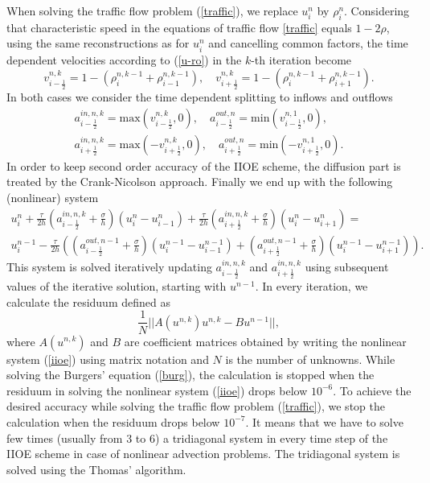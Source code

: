\documentclass[a4paper,12pt,twoside]{report}%
\newcounter{eqn}
\begin{document}
When solving the traffic flow problem (\ref{traffic}), we replace $ u^n_i $ by $ \rho^n_i $. Considering that characteristic speed in the equations of traffic flow \eqref{traffic} equals $ 1-2\rho $, using the same reconstructions as for $ u^n_i $ and cancelling common factors, the time dependent velocities according to (\ref{u-ro}) in the $ k $-th iteration become
\[ v^{n,k}_{i-\frac{1}{2}} = 1 - (\rho^{n,k-1}_i + \rho^{n,k-1}_{i-1}),\quad
v^{n,k}_{i+\frac{1}{2}} = 1 - (\rho^{n,k-1}_i + \rho^{n,k-1}_{i+1}). \]
In both cases we consider the time dependent splitting to inflows and outflows
\begin{eqnarray}
	a^{in,n,k}_{i-\frac{1}{2}} = \textrm{max}(v^{n,k}_{i-\frac{1}{2}},0),\quad 
	a^{out,n}_{i-\frac{1}{2}} = \textrm{min}(v^{n,1}_{i-\frac{1}{2}},0), \nonumber
	\\
	a^{in,n,k}_{i+\frac{1}{2}} = \textrm{max}(-v^{n,k}_{i+\frac{1}{2}},0),\quad 
	a^{out,n}_{i+\frac{1}{2}} = \textrm{min}(-v^{n,1}_{i+\frac{1}{2}},0). \nonumber
\end{eqnarray}
In order to keep second order accuracy of the IIOE scheme, the diffusion part is treated
by the Crank-Nicolson approach. Finally we end up with the following (nonlinear) system
\begin{eqnarray}
	\label{iioe}
	u^n_i + \frac{\tau}{2h} \left(a^{in,n,k}_{i-\frac{1}{2}} + \frac{\sigma}{h} \right) \left(u^n_i - u^n_{i-1}\right) + 
	\frac{\tau}{2h} \left(a^{in,n,k}_{i+\frac{1}{2}} + \frac{\sigma}{h} \right) \left(u^n_i - u^n_{i+1}\right) = \\
	u^{n-1}_i - \frac{\tau}{2h} \left(\left(a^{out,n-1}_{i-\frac{1}{2}} + \frac{\sigma}{h} \right) \left(u^{n-1}_i - u^{n-1}_{i-1}\right) + 
	\left(a^{out,n-1}_{i+\frac{1}{2}} + \frac{\sigma}{h} \right) \left(u^{n-1}_i - u^{n-1}_{i+1}\right)\right).\nonumber
\end{eqnarray}
This system is solved iteratively updating $ a^{in,n,k}_{i-\frac{1}{2}} $ and $ a^{in,n,k}_{i+\frac{1}{2}} $ using subsequent values of the iterative solution, starting with $ u^{n-1} $. In every iteration, we calculate the residuum defined as
\[ \frac{1}{N}||A(u^{n,k})u^{n,k} - Bu^{n-1}||, \]
where $ A(u^{n,k}) $ and $ B $ are coefficient matrices obtained by writing the nonlinear system (\ref{iioe}) using matrix notation and $ N $ is the number of unknowns.
While solving the Burgers' equation (\ref{burg}), the calculation is stopped when the residuum in solving the nonlinear system (\ref{iioe}) drops below $ 10^{-6} $. To achieve the desired accuracy while solving the traffic flow problem (\ref{traffic}), we stop the calculation when the residuum drops below $ 10^{-7} $. It  means that we have to solve few times (usually from 3 to 6) a tridiagonal system in every time step of the IIOE scheme in case of nonlinear advection problems. The tridiagonal system is solved using the Thomas' algorithm.
\end{document}
